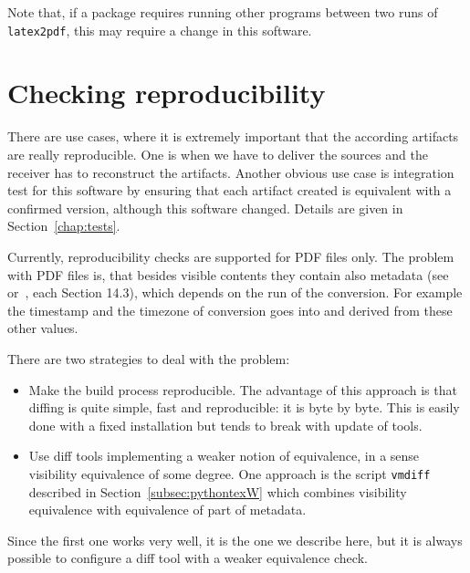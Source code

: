 Note that, if a package requires running other programs 
between two runs of \texttt{latex2pdf}, 
this may require a change in this software. 

\section{Checking reproducibility}\label{sec:chkReprod}

There are use cases, where it is extremely important 
that the according artifacts are really reproducible. 
One is when we have to deliver the sources 
and the receiver has to reconstruct the artifacts. 
Another obvious use case is integration test for this software 
by ensuring that each artifact created 
is equivalent with a confirmed version, 
although this software changed. 
Details are given in Section~\ref{chap:tests}. 


Currently, reproducibility checks are supported for PDF files only. 
The problem with PDF files is, that besides visible contents 
they contain also metadata (see~\cite{Pdf17} or~\cite{Pdf20}, each Section 14.3), 
which depends on the run of the conversion. 
For example the timestamp and the timezone of conversion goes into 
and derived from these other values. 

There are two strategies to deal with the problem: 
%
\begin{itemize}
  \item 
  Make the build process reproducible. 
  The advantage of this approach is that diffing is quite simple, 
  fast and reproducible: it is byte by byte. 
  This is easily done with a fixed installation 
  but tends to break with update of tools. 
  \item 
  Use diff tools implementing a weaker notion of equivalence, 
  in a sense visibility equivalence of some degree. 
  One approach is the script \texttt{vmdiff} 
  described in Section~\ref{subsec:pythontexW} 
  which combines visibility equivalence 
  with equivalence of part of metadata. 
\end{itemize}%

Since the first one works very well, it is the one we describe here, 
but it is always possible to configure a diff tool with a weaker equivalence check. 

